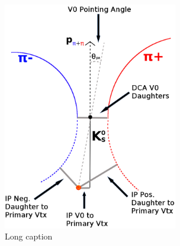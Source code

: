 \begin{figure}[h]
\begin{minipage}{18pc}
\includegraphics[width=18pc]{3_DataSelection/Figures/K0Cuts.pdf}
\end{minipage} 
\caption[Short Caption]{\label{fig:MomResLL} Long caption}
\end{figure}



